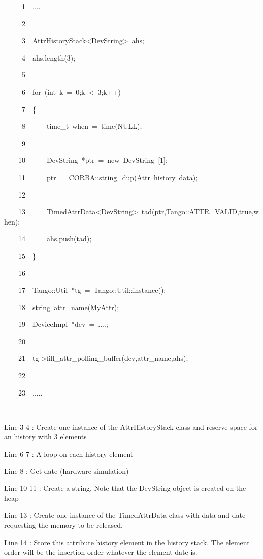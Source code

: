 
\begin{lyxcode}
~~~~~1~~....

~~~~~2~~

~~~~~3~~AttrHistoryStack<DevString>~ahs;

~~~~~4~~ahs.length(3);

~~~~~5~~

~~~~~6~~for~(int~k~=~0;k~<~3;k++)

~~~~~7~~\{

~~~~~8~~~~~~time\_t~when~=~time(NULL);

~~~~~9~~

~~~~10~~~~~~DevString~{*}ptr~=~new~DevString~{[}1{]};

~~~~11~~~~~~ptr~=~CORBA::string\_dup(\textquotedbl{}Attr~history~data\textquotedbl{});

~~~~12~~

~~~~13~~~~~~TimedAttrData<DevString>~tad(ptr,Tango::ATTR\_VALID,true,when);

~~~~14~~~~~~ahs.push(tad);

~~~~15~~\}

~~~~16~~

~~~~17~~Tango::Util~{*}tg~=~Tango::Util::instance();

~~~~18~~string~attr\_name(\textquotedbl{}MyAttr\textquotedbl{});

~~~~19~~DeviceImpl~{*}dev~=~....;

~~~~20~~

~~~~21~~tg->fill\_attr\_polling\_buffer(dev,attr\_name,ahs);

~~~~22~~

~~~~23~~.....

~~
\end{lyxcode}


Line 3-4 : Create one instance of the AttrHistoryStack class and reserve
space for an history with 3 elements

Line 6-7 : A loop on each history element

Line 8 : Get date (hardware simulation)

Line 10-11 : Create a string. Note that the DevString object is created
on the heap

Line 13 : Create one instance of the TimedAttrData class with data
and date requesting the memory to be released.

Line 14 : Store this attribute history element in the history stack.
The element order will be the insertion order whatever the element
date is.

